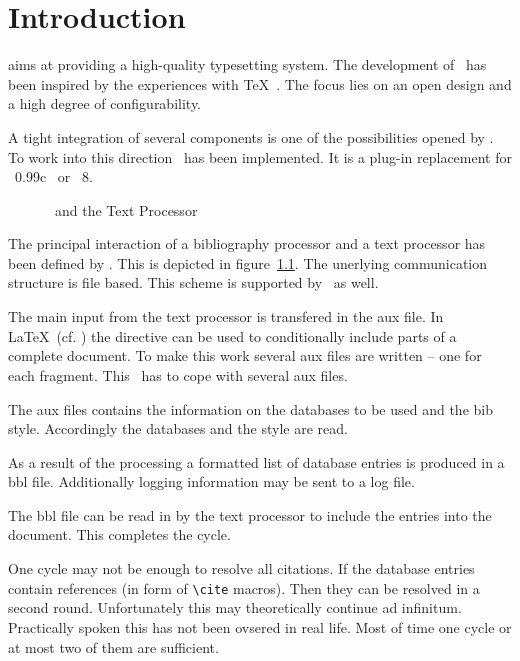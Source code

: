 
\chapter{Introduction}

\ExTeX{} aims at providing a high-quality typesetting system. The
development of \ExTeX\ has been inspired by the experiences with \TeX\
\cite{knuth:texbook}.
The focus lies on an open design and a high degree of configurability.

A tight integration of several components is one of the possibilities
opened by \ExTeX. To work into this direction \ExBib\ has been
implemented. It is a plug-in replacement for \BibTeX~0.99c\
\cite{btxdoc,btxhak} or \BibTeX~8.

\begin{figure}[hb]
  \centering
  
  \caption{\ExBib\ and the Text Processor}
  \label{fig:files}
\end{figure}
The principal interaction of a bibliography processor and a text
processor has been defined by \BibTeX. This is depicted in
figure~\ref{fig:files}. The unerlying communication structure is file
based. This scheme is supported by \ExBib\ as well.

The main input from the text processor is transfered in the aux file.
In \LaTeX\ (cf. \cite{lamport:latex}) the directive \verb||
can be used to conditionally include parts of a complete document. To
make this work several aux files are written -- one for each fragment.
This \ExBib\ has to cope with several aux files.

The aux files contains the information on the databases to be used
and the bib style. Accordingly the databases and the style are read.

As a result of the processing a formatted list of database entries is
produced in a bbl file. Additionally logging information may be sent
to a log file.

The bbl file can be read in by the text processor to include the
entries into the document. This completes the cycle.

One cycle may not be enough to resolve all citations. If the database
entries contain references (in form of \verb|\cite| macros). Then they
can be resolved in a second round. Unfortunately this may
theoretically continue ad infinitum. Practically spoken this has not
been ovsered in real life. Most of time one cycle or at most two of
them are sufficient.


